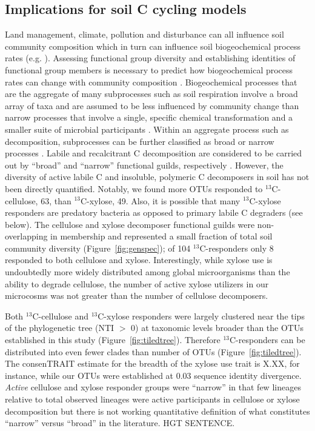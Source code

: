 \subsection{Implications for soil C cycling models}
Land management, climate, pollution and disturbance can all influence soil
community composition \citep{McGuire2010} which in turn can influence soil
biogeochemical process rates (e.g. \citep{Berlemont2014a}). Assessing
functional group diversity and establishing identities of functional group
members is necessary to predict how biogeochemical process rates can change
with community composition \citep{Schimel_1995,McGuire2010}. 
Biogeochemical processes that are the aggregate of many subprocesses such as
soil respiration involve a broad array of taxa and are assumed to be less
influenced by community change than narrow processes that involve a single,
specific chemical transformation and a smaller suite of microbial participants
\citep{Schimel_1995}. Within an aggregate process such as decomposition,
subprocesses can be further classified as broad or narrow processes
\citep{McGuire2010}. Labile and recalcitrant C decomposition are considered to
be carried out by ``broad'' and ``narrow'' functional guilds, respectively
\citep{McGuire2010}. However, the diversity of active labile C and insoluble,
polymeric C decomposers in soil has not been directly quantified. Notably, we
found more OTUs responded to $^{13}$C-cellulose, 63, than $^{13}$C-xylose, 49.
Also, it is possible that many $^{13}$C-xylose responders are predatory
bacteria as opposed to primary labile C degraders (see below). The cellulose
and xylose decomposer functional guilds were non-overlapping in membership and
represented a small fraction of total soil community diversity
(Figure~\ref{fig:genspec}); of 104 $^{13}$C-responders only 8 responded to both
cellulose and xylose. Interestingly, while xylose use is undoubtedly more
widely distributed among global microorganisms than the ability to degrade
cellulose, the number of active xylose utilizers in our microcosms was not
greater than the number of cellulose decomposers.

Both $^{13}$C-cellulose and $^{13}$C-xylose responders were largely clustered
near the tips of the phylogenetic tree (NTI $>$ 0) at taxonomic levels broader
than the OTUs established in this study (Figure~\ref{fig:tiledtree}). Therefore
$^{13}$C-responders can be distributed into even fewer clades than number of
OTUs (Figure~\ref{fig:tiledtree}). The consenTRAIT estimate for the breadth of
the xylose use trait is X.XX, for instance, while our OTUs were established at
0.03 sequence identity divergence. \textit{Active} cellulose and xylose
responder groups were ``narrow'' in that few lineages relative to total
observed lineages were active participants in cellulose or xylose
decomposition but there is not working quantitative definition of what
constitutes ``narrow'' versus ``broad'' in the literature. HGT SENTENCE.

